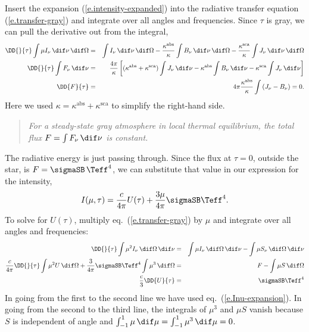 Insert the expansion (\ref{e.intensity-expanded}) into the radiative transfer equation (\ref{e.transfer-gray}) and integrate over all angles and frequencies. Since $\tau$ is gray, we can pull the derivative out from the integral,
\begin{eqnarray*}
	\DD{}{\tau}\int \mu I_{\nu}\,\dif\nu\,\dif\Omega &=& \int I_{\nu}\,\dif\nu\,\dif\Omega - \frac{\kappa^{\mathrm{abs}}}{\kappa}\int B_{\nu}\,\dif\nu\,\dif\Omega - \frac{\kappa^{\mathrm{sca}}}{\kappa} \int J_{\nu}\,\dif\nu\,\dif\Omega\\
	\DD{}{\tau}\int F_{\nu}\,\dif\nu &=& \frac{4\pi}{\kappa}\left[
		(\kappa^{\mathrm{abs}}+\kappa^{\mathrm{sca}})\int J_{\nu}\,\dif\nu
		- \kappa^{\mathrm{abs}}\int B_{\nu}\,\dif\nu
		- \kappa^{\mathrm{sca}}\int J_{\nu}\,\dif\nu\right]\\
	\DD{F}{\tau} &=& 4\pi\frac{\kappa^{\mathrm{abs}}}{\kappa}\int\left(J_{\nu}-B_{\nu}\right) = 0.
\end{eqnarray*}
Here we used $\kappa = \kappa^{\mathrm{abs}}+\kappa^{\mathrm{sca}}$ to simplify the right-hand side.

\begin{quote}
\emph{For a steady-state gray atmosphere in local thermal equilibrium, the total flux $F = \int F_{\nu}\,\dif\nu$ is constant.}
\end{quote}
The radiative energy is just passing through. Since the flux at $\tau=0$, outside the star, is $F = \sigmaSB\,\Teff^{4}$, we can substitute that value in our expression for the intensity,
\begin{equation}
\label{e.Inu-expansion}
	I(\mu,\tau) = \frac{c}{4\pi} U(\tau) + \frac{3\mu}{4\pi}\sigmaSB\Teff^{4}.
\end{equation}
To solve for $U(\tau)$, multiply eq.~(\ref{e.transfer-gray}) by $\mu$ and integrate over all angles and frequencies:
\begin{eqnarray}
	\DD{}{\tau}\int\mu^{2}I_{\nu}\,\dif\Omega\,\dif\nu &=& \int\mu I_{\nu}\,\dif\Omega\,\dif\nu
		- \int \mu S_{\nu}\,\dif\Omega\,\dif\nu\nonumber\\
	\frac{c}{4\pi}\DD{}{\tau} \int \mu^{2}U\,\dif\Omega 
		+ \frac{3}{4\pi}\sigmaSB\Teff^{4}\int\mu^{3}\,\dif\Omega &=& F - \int \mu S\,\dif\Omega\nonumber\\
	\frac{c}{3}\DD{U}{\tau} &=& \sigmaSB\Teff^{4}
\label{e.ODE-U}
\end{eqnarray}
In going from the first to the second line we have used eq.~(\ref{e.Inu-expansion}). In going from the second to the third line, the integrals of $\mu^{3}$ and $\mu S$ vanish because $S$ is independent of angle and $\int_{-1}^{1} \mu\,\dif\mu = \int_{-1}^{1}\mu^{3}\,\dif\mu = 0$. 

